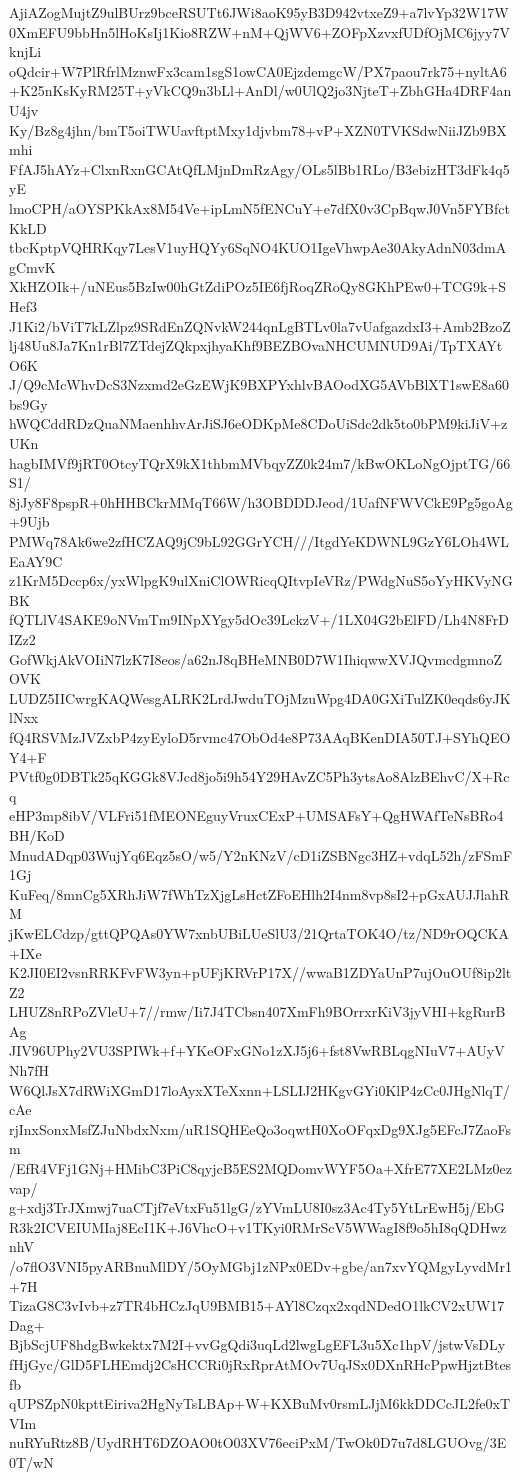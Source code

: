 AjiAZogMujtZ9ulBUrz9bceRSUTt6JWi8aoK95yB3D942vtxeZ9+a7lvYp32W17W
0XmEFU9bbHn5lHoKsIj1Kio8RZW+nM+QjWV6+ZOFpXzvxfUDfOjMC6jyy7VknjLi
oQdcir+W7PlRfrlMznwFx3cam1sgS1owCA0EjzdemgcW/PX7paou7rk75+nyltA6
+K25nKsKyRM25T+yVkCQ9n3bLl+AnDl/w0UlQ2jo3NjteT+ZbhGHa4DRF4anU4jv
Ky/Bz8g4jhn/bmT5oiTWUavftptMxy1djvbm78+vP+XZN0TVKSdwNiiJZb9BXmhi
FfAJ5hAYz+ClxnRxnGCAtQfLMjnDmRzAgy/OLs5lBb1RLo/B3ebizHT3dFk4q5yE
lmoCPH/aOYSPKkAx8M54Ve+ipLmN5fENCuY+e7dfX0v3CpBqwJ0Vn5FYBfctKkLD
tbcKptpVQHRKqy7LesV1uyHQYy6SqNO4KUO1IgeVhwpAe30AkyAdnN03dmAgCmvK
XkHZOIk+/uNEus5BzIw00hGtZdiPOz5IE6fjRoqZRoQy8GKhPEw0+TCG9k+SHef3
J1Ki2/bViT7kLZlpz9SRdEnZQNvkW244qnLgBTLv0la7vUafgazdxI3+Amb2BzoZ
lj48Uu8Ja7Kn1rBl7ZTdejZQkpxjhyaKhf9BEZBOvaNHCUMNUD9Ai/TpTXAYtO6K
J/Q9cMcWhvDcS3Nzxmd2eGzEWjK9BXPYxhlvBAOodXG5AVbBlXT1swE8a60bs9Gy
hWQCddRDzQuaNMaenhhvArJiSJ6eODKpMe8CDoUiSdc2dk5to0bPM9kiJiV+zUKn
hagbIMVf9jRT0OtcyTQrX9kX1thbmMVbqyZZ0k24m7/kBwOKLoNgOjptTG/66S1/
8jJy8F8pspR+0hHHBCkrMMqT66W/h3OBDDDJeod/1UafNFWVCkE9Pg5goAg+9Ujb
PMWq78Ak6we2zfHCZAQ9jC9bL92GGrYCH///ItgdYeKDWNL9GzY6LOh4WLEaAY9C
z1KrM5Dccp6x/yxWlpgK9ulXniClOWRicqQItvpIeVRz/PWdgNuS5oYyHKVyNGBK
fQTLlV4SAKE9oNVmTm9INpXYgy5dOc39LckzV+/1LX04G2bElFD/Lh4N8FrDIZz2
GofWkjAkVOIiN7lzK7I8eos/a62nJ8qBHeMNB0D7W1IhiqwwXVJQvmcdgmnoZOVK
LUDZ5IICwrgKAQWesgALRK2LrdJwduTOjMzuWpg4DA0GXiTulZK0eqds6yJKlNxx
fQ4RSVMzJVZxbP4zyEyloD5rvmc47ObOd4e8P73AAqBKenDIA50TJ+SYhQEOY4+F
PVtf0g0DBTk25qKGGk8VJcd8jo5i9h54Y29HAvZC5Ph3ytsAo8AlzBEhvC/X+Rcq
eHP3mp8ibV/VLFri51fMEONEguyVruxCExP+UMSAFsY+QgHWAfTeNsBRo4BH/KoD
MnudADqp03WujYq6Eqz5sO/w5/Y2nKNzV/cD1iZSBNgc3HZ+vdqL52h/zFSmF1Gj
KuFeq/8mnCg5XRhJiW7fWhTzXjgLsHctZFoEHlh2I4nm8vp8sI2+pGxAUJJlahRM
jKwELCdzp/gttQPQAs0YW7xnbUBiLUeSlU3/21QrtaTOK4O/tz/ND9rOQCKA+IXe
K2JI0EI2vsnRRKFvFW3yn+pUFjKRVrP17X//wwaB1ZDYaUnP7ujOuOUf8ip2ltZ2
LHUZ8nRPoZVleU+7//rmw/Ii7J4TCbsn407XmFh9BOrrxrKiV3jyVHI+kgRurBAg
JIV96UPhy2VU3SPIWk+f+YKeOFxGNo1zXJ5j6+fst8VwRBLqgNIuV7+AUyVNh7fH
W6QlJsX7dRWiXGmD17loAyxXTeXxnn+LSLIJ2HKgvGYi0KlP4zCc0JHgNlqT/cAe
rjInxSonxMsfZJuNbdxNxm/uR1SQHEeQo3oqwtH0XoOFqxDg9XJg5EFcJ7ZaoFsm
/EfR4VFj1GNj+HMibC3PiC8qyjcB5ES2MQDomvWYF5Oa+XfrE77XE2LMz0ezvap/
g+xdj3TrJXmwj7uaCTjf7eVtxFu51lgG/zYVmLU8I0sz3Ac4Ty5YtLrEwH5j/EbG
R3k2ICVEIUMIaj8EcI1K+J6VhcO+v1TKyi0RMrScV5WWagI8f9o5hI8qQDHwznhV
/o7flO3VNI5pyARBnuMlDY/5OyMGbj1zNPx0EDv+gbe/an7xvYQMgyLyvdMr1+7H
TizaG8C3vIvb+z7TR4bHCzJqU9BMB15+AYl8Czqx2xqdNDedO1lkCV2xUW17Dag+
BjbScjUF8hdgBwkektx7M2I+vvGgQdi3uqLd2lwgLgEFL3u5Xc1hpV/jstwVsDLy
fHjGyc/GlD5FLHEmdj2CsHCCRi0jRxRprAtMOv7UqJSx0DXnRHcPpwHjztBtesfb
qUPSZpN0kpttEiriva2HgNyTsLBAp+W+KXBuMv0rsmLJjM6kkDDCcJL2fe0xTVIm
nuRYuRtz8B/UydRHT6DZOAO0tO03XV76eciPxM/TwOk0D7u7d8LGUOvg/3E0T/wN

